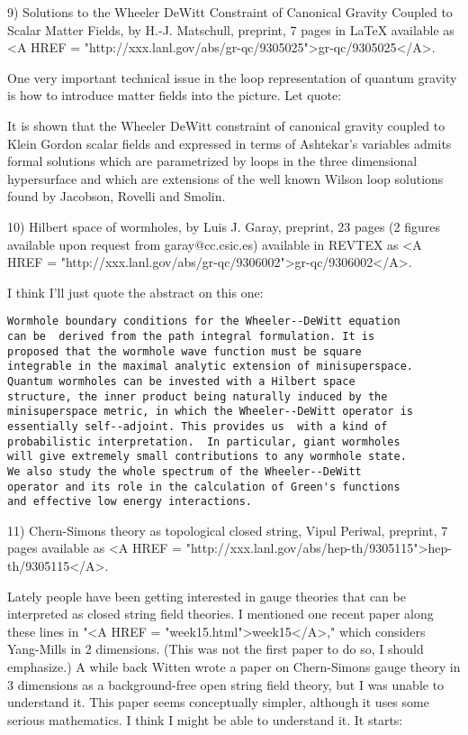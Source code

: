 9)  Solutions to the Wheeler DeWitt Constraint of Canonical Gravity Coupled to
Scalar Matter Fields, by H.-J. Matschull, preprint, 7 pages in LaTeX
available as <A HREF = "http://xxx.lanl.gov/abs/gr-qc/9305025">gr-qc/9305025</A>.

One very important technical issue in the loop representation of quantum
gravity is how to introduce matter fields into the picture.  Let quote:

It is shown that the Wheeler DeWitt constraint of canonical gravity
coupled to Klein Gordon scalar fields and expressed in terms
of Ashtekar's variables admits formal solutions which are parametrized
by loops in the three dimensional hypersurface and which are
extensions of  the well known Wilson loop solutions found by
Jacobson, Rovelli and Smolin.

10) Hilbert space of wormholes, by Luis J. Garay, preprint, 23 pages (2
figures available upon request from garay@cc.csic.es) available in REVTEX as
<A HREF = "http://xxx.lanl.gov/abs/gr-qc/9306002">gr-qc/9306002</A>.   
 
I think I'll just quote the abstract on this one:

\begin{verbatim}
Wormhole boundary conditions for the Wheeler--DeWitt equation
can be  derived from the path integral formulation. It is
proposed that the wormhole wave function must be square
integrable in the maximal analytic extension of minisuperspace.
Quantum wormholes can be invested with a Hilbert space
structure, the inner product being naturally induced by the
minisuperspace metric, in which the Wheeler--DeWitt operator is
essentially self--adjoint. This provides us  with a kind of
probabilistic interpretation.  In particular, giant wormholes
will give extremely small contributions to any wormhole state.
We also study the whole spectrum of the Wheeler--DeWitt
operator and its role in the calculation of Green's functions
and effective low energy interactions.
\end{verbatim}
    

11) Chern-Simons theory as topological closed string,
Vipul Periwal, preprint, 7 pages available as <A HREF = "http://xxx.lanl.gov/abs/hep-th/9305115">hep-th/9305115</A>.  

Lately people have been getting interested in gauge theories that can be
interpreted as closed string field theories.  I mentioned one recent
paper along these lines in "<A HREF = "week15.html">week15</A>," which considers Yang-Mills in 2
dimensions.  (This was not the first paper to do so, I should
emphasize.)  A while back Witten wrote a paper on Chern-Simons gauge
theory in 3 dimensions as a background-free open string field theory,
but I was unable to understand it.  This paper seems conceptually
simpler, although it uses some serious mathematics.  I think I might be
able to understand it.  It starts:

